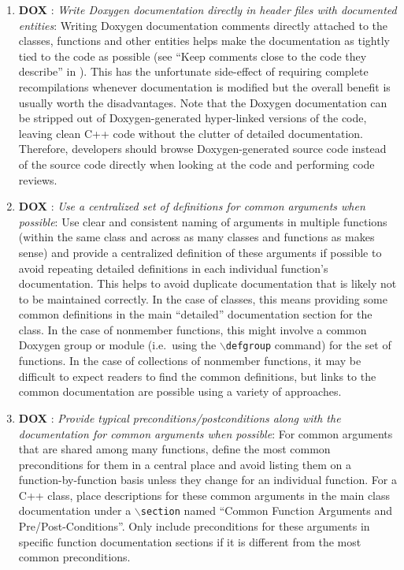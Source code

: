 \begin{enumerate}

{}\item{}\textbf{DOX }:
{}\textit{Write Doxygen documentation directly in header files with documented
entities}: Writing Doxygen documentation comments directly attached to the
classes, functions and other entities helps make the documentation as tightly
tied to the code as possible (see ``Keep comments close to the code they
describe'' in {}\cite[Section 32.5]{CodeComplete2nd04}).  This has the
unfortunate side-effect of requiring complete recompilations whenever
documentation is modified but the overall benefit is usually worth the
disadvantages.  Note that the Doxygen documentation can be stripped out of
Doxygen-generated hyper-linked versions of the code, leaving clean C++ code
without the clutter of detailed documentation.  Therefore, developers should
browse Doxygen-generated source code instead of the source code directly when
looking at the code and performing code reviews.

{}\item{}\textbf{DOX }:
{}\textit{Use a centralized set of definitions for common arguments when
possible}: Use clear and consistent naming of arguments in multiple functions
(within the same class and across as many classes and functions as makes
sense) and provide a centralized definition of these arguments if possible to
avoid repeating detailed definitions in each individual function's
documentation.  This helps to avoid duplicate documentation that is likely not
to be maintained correctly.  In the case of classes, this means providing some
common definitions in the main ``detailed'' documentation section for the
class.  In the case of nonmember functions, this might involve a common
Doxygen group or module (i.e.\ using the {}\texttt{$\backslash$defgroup}
command) for the set of functions.  In the case of collections of nonmember
functions, it may be difficult to expect readers to find the common
definitions, but links to the common documentation are possible using a
variety of approaches.

{}\item{}\textbf{DOX }:
{}\textit{Provide typical preconditions/postconditions along with the
documentation for common arguments when possible}: For common arguments that
are shared among many functions, define the most common preconditions for them
in a central place and avoid listing them on a function-by-function basis
unless they change for an individual function.  For a C++ class, place
descriptions for these common arguments in the main class documentation under
a {}\texttt{$\backslash$section} named ``Common Function Arguments and
Pre/Post-Conditions''.  Only include preconditions for these arguments in
specific function documentation sections if it is different from the most
common preconditions.


\end{enumerate}
